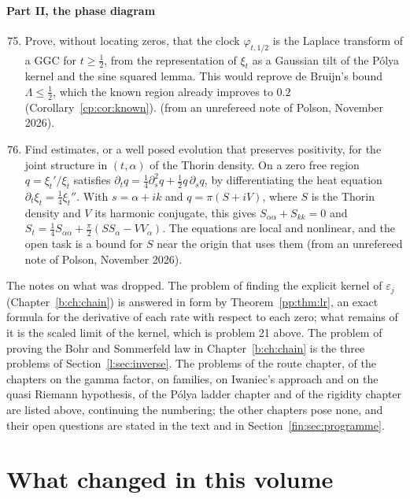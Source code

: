\paragraph{Part II, the phase diagram}
\begin{enumerate}
\setcounter{enumi}{74}
\item Prove, without locating zeros, that the clock $\varphi_{t,1/2}$ is the Laplace transform of a GGC for $t\ge\frac12$, from the representation of $\xi_t$ as a Gaussian tilt of the P\'olya kernel and the sine squared lemma. This would reprove de Bruijn's bound $\Lambda\le\frac12$, which the known region already improves to $0.2$ (Corollary~\ref{cp:cor:known}). (from an unrefereed note of Polson, November 2026).
\item Find estimates, or a well posed evolution that preserves positivity, for the joint structure in $(t,\alpha)$ of the Thorin density. On a zero free region $q=\xi_t'/\xi_t$ satisfies $\partial_tq=\frac14\partial_s^2q+\frac12q\,\partial_sq$, by differentiating the heat equation $\partial_t\xi_t=\frac14\xi_t''$. With $s=\alpha+ik$ and $q=\pi(S+iV)$, where $S$ is the Thorin density and $V$ its harmonic conjugate, this gives $S_{\alpha\alpha}+S_{kk}=0$ and $S_t=\frac14S_{\alpha\alpha}+\frac\pi2(SS_\alpha-VV_\alpha)$. The equations are local and nonlinear, and the open task is a bound for $S$ near the origin that uses them (from an unrefereed note of Polson, November 2026).
\end{enumerate}

The notes on what was dropped. The problem of finding the explicit kernel of $\varepsilon_j$ (Chapter~\ref{b:ch:chain}) is answered in form by Theorem~\ref{pp:thm:lr}, an exact formula for the derivative of each rate with respect to each zero; what remains of it is the scaled limit of the kernel, which is problem 21 above. The problem of proving the Bohr and Sommerfeld law in Chapter~\ref{b:ch:chain} is the three problems of Section~\ref{l:sec:inverse}. The problems of the route chapter, of the chapters on the gamma factor, on families, on Iwaniec's approach and on the quasi Riemann hypothesis, of the P\'olya ladder chapter and of the rigidity chapter are listed above, continuing the numbering; the other chapters pose none, and their open questions are stated in the text and in Section~\ref{fin:sec:programme}.

\section{What changed in this volume}\label{fin:sec:changed}


